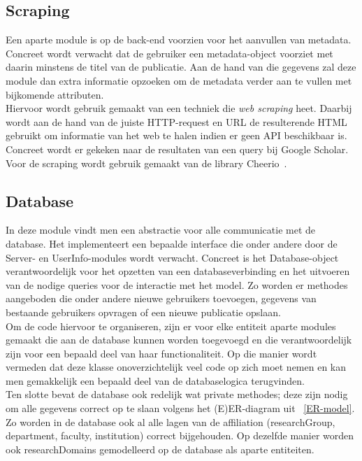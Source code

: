 \documentclass{article}
\begin{document}
\subsection{Scraping}

Een aparte module is op de back-end voorzien voor het aanvullen van metadata. Concreet wordt verwacht dat de gebruiker een metadata-object voorziet met daarin minstens de titel van de publicatie. Aan de hand van die gegevens zal deze module dan extra informatie opzoeken om de metadata verder aan te vullen met bijkomende attributen. \\

Hiervoor wordt gebruik gemaakt van een techniek die \textit{web scraping} heet. Daarbij wordt aan de hand van de juiste HTTP-request en URL de resulterende HTML gebruikt om informatie van het web te halen indien er geen API beschikbaar is. Concreet wordt er gekeken naar de resultaten van een query bij Google Scholar. Voor de scraping wordt gebruik gemaakt van de library Cheerio~\cite{website:cheerio}.

\subsection{Database}

In deze module vindt men een abstractie voor alle communicatie met de database. Het implementeert een bepaalde interface die onder andere door de Server- en UserInfo-modules wordt verwacht. Concreet is het Database-object verantwoordelijk voor het opzetten van een databaseverbinding en het uitvoeren van de nodige queries voor de interactie met het model. Zo worden er methodes aangeboden die onder andere nieuwe gebruikers toevoegen, gegevens van bestaande gebruikers opvragen of een nieuwe publicatie opslaan.\\

Om de code hiervoor te organiseren, zijn er voor elke entiteit aparte modules gemaakt die aan de database kunnen worden toegevoegd en die verantwoordelijk zijn voor een bepaald deel van haar functionaliteit. Op die manier wordt vermeden dat deze klasse onoverzichtelijk veel code op zich moet nemen en kan men gemakkelijk een bepaald deel van de databaselogica terugvinden. \\

Ten slotte bevat de database ook redelijk wat private methodes; deze zijn nodig om alle gegevens correct op te slaan volgens het (E)ER-diagram uit ~\ref{ER-model}. Zo worden in de database ook al alle lagen van de affiliation (researchGroup, department, faculty, institution) correct bijgehouden. Op dezelfde manier worden ook researchDomains gemodelleerd op de database als aparte entiteiten.\\
\end{document}
